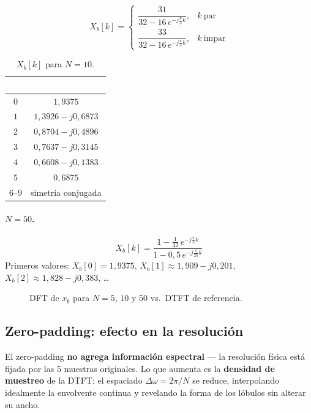 \documentclass[../Main_Include.tex]{subfiles}
\begin{document}
\[
    X_b[k] = \begin{cases}
        \dfrac{31}{32 - 16\,e^{-j\frac{\pi}{5}k}}, & k\ \text{par} \\[8pt]
        \dfrac{33}{32 - 16\,e^{-j\frac{\pi}{5}k}}, & k\ \text{impar}
    \end{cases}
\]

\begin{table}[H]
\centering
\renewcommand{\arraystretch}{1.4}
\begin{tabular}{cc}
\toprule
\rowcolor{azulprinc}
\textcolor{white}{\textbf{$k$}} &
\textcolor{white}{\textbf{$X_b[k]$}} \\
\midrule
\rowcolor{grisclaro}
$0$ & $1{,}9375$ \\
$1$ & $1{,}3926 - j0{,}6873$ \\
\rowcolor{grisclaro}
$2$ & $0{,}8704 - j0{,}4896$ \\
$3$ & $0{,}7637 - j0{,}3145$ \\
\rowcolor{grisclaro}
$4$ & $0{,}6608 - j0{,}1383$ \\
$5$ & $0{,}6875$ \\
\rowcolor{grisclaro}
$6$--$9$ & simetría conjugada \\
\bottomrule
\end{tabular}
\caption{$X_b[k]$ para $N = 10$.}
\end{table}

\paragraph{$N = 50$.}
\[
    X_b[k] = \frac{1 - \tfrac{1}{32}\,e^{-j\frac{\pi}{5}k}}
                  {1 - 0{,}5\,e^{-j\frac{\pi}{25}k}}
\]
Primeros valores: $X_b[0] = 1{,}9375$, $X_b[1] \approx 1{,}909 - j0{,}201$,
$X_b[2] \approx 1{,}828 - j0{,}383$, \dots

\begin{figure}[H]
    \centering
    \caption{DFT de $x_b$ para $N = 5$, $10$ y $50$ vs.\ DTFT de referencia.}
\end{figure}

\subsection*{Zero-padding: efecto en la resolución}

El zero-padding \textbf{no agrega información espectral} — la resolución
física está fijada por las 5 muestras originales. Lo que aumenta es la
\textbf{densidad de muestreo} de la DTFT: el espaciado
$\Delta\omega = 2\pi/N$ se reduce, interpolando idealmente la envolvente
continua y revelando la forma de los lóbulos sin alterar su ancho.
\end{document}

